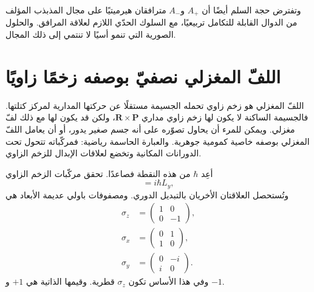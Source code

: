 وتفترض حجة السلم أيضًا أن \(A_{+}\) و\(A_{-}\) مترافقان هيرميتيًا على مجال المذبذب المؤلف من الدوال القابلة للتكامل تربيعيًا، مع السلوك الحدّي اللازم لعلاقة المرافق. والحلول الصورية التي تنمو أسيًا لا تنتمي إلى ذلك المجال.

\begin{classroomqa}
\end{classroomqa}

\section{اللفّ المغزلي نصفيّ بوصفه زخمًا زاويًا}

اللفّ المغزلي هو زخم زاوي تحمله الجسيمة مستقلًا عن حركتها المدارية لمركز كتلتها. فالجسيمة الساكنة لا يكون لها زخم زاوي مداري \(\mathbf R\times\mathbf P\)، ولكن قد يكون لها مع ذلك لفّ مغزلي. ويمكن للمرء أن يحاول تصوّره على أنه جسم صغير يدور، أو أن يعامل اللفّ المغزلي بوصفه خاصية كمومية جوهرية. والعبارة الحاسمة رياضية: فمركّباته تتحول تحت الدورانات المكانية وتخضع لعلاقات الإبدال للزخم الزاوي.

أعِد \(\hbar\) من هذه النقطة فصاعدًا. تحقق مركّبات الزخم الزاوي
\begin{equation}
[L_{z},L_{x}]=i\hbar L_{y},
\end{equation}
وتُستحصل العلاقتان الأخريان بالتبديل الدوري. ومصفوفات باولي عديمة الأبعاد هي
\begin{equation}
\begin{aligned}
\sigma_{z}&=
\begin{pmatrix}
1&0\\
0&-1
\end{pmatrix},\\[0.4em]
\sigma_{x}&=
\begin{pmatrix}
0&1\\
1&0
\end{pmatrix},\\[0.4em]
\sigma_{y}&=
\begin{pmatrix}
0&-i\\
i&0
\end{pmatrix}.
\end{aligned}
\end{equation}
وفي هذا الأساس تكون \(\sigma_{z}\) قطرية. وقيمها الذاتية هي \(+1\) و
\(-1\).

